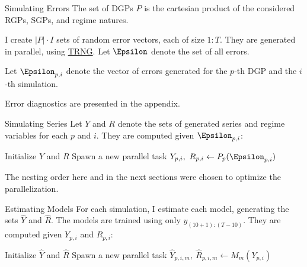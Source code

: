 \documentclass[
  ignorenonframetext,
]{beamer}
\begin{document}
\begin{frame}{Simulating Errors}
\label{simulating-errors}
The set of DGPs \(P\) is the cartesian product of the considered RGPs,
SGPs, and regime natures.

I create \(|P| \cdot I\) sets of random error vectors, each of size
\(1:T\). They are generated in parallel, using
\href{https://www.numbercrunch.de/trng/}{TRNG}. Let \(\Epsilon\) denote
the set of all errors.

Let \(\Epsilon_{p, i}\) denote the vector of errors generated for the
\(p\)-th DGP and the \(i\)-th simulation.

Error diagnostics are presented in the appendix.
\end{frame}

\begin{frame}{Simulating Series}
\label{simulating-series}
Let \(Y\) and \(R\) denote the sets of generated series and regime
variables for each \(p\) and \(i\). They are computed given
\(\Epsilon_{p, i}\):

\begin{algorithm}[H]
\begin{algorithmic}[1]
    \State Initialize $Y$ and $R$
        \State Spawn a new parallel task
        \State $Y_{p, i},~ R_{p, i} \gets P_p(\Epsilon_{p, i})$
\EndFor
\end{algorithmic}
\end{algorithm}

The nesting order here and in the next sections were chosen to optimize
the parallelization.
\end{frame}

\begin{frame}{Estimating Models}
\label{estimating-models}
For each simulation, I estimate each model, generating the sets
\(\hat{Y}\) and \(\hat{R}\). The models are trained using only
\(y_{(10 + 1):(T-10)}\). They are computed given \(Y_{p, i}\) and
\(R_{p, i}\):

\begin{algorithm}[H]
\begin{algorithmic}[1]
    \State Initialize $\hat{Y}$ and $\hat{R}$
        \State Spawn a new parallel task
            \State $\hat{Y}_{p, i, m},~ \hat{R}_{p, i, m} \gets M_m(Y_{p, i})$
        \EndFor
    \EndFor
\end{algorithmic}
\end{algorithm}
\end{frame}
\end{document}

